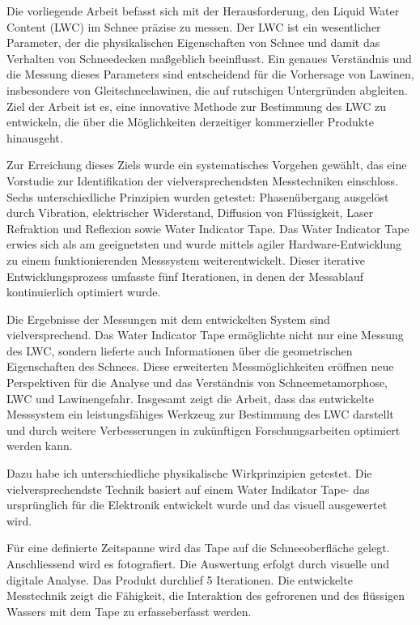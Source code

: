 Die vorliegende Arbeit befasst sich mit der Herausforderung, den Liquid Water Content (LWC) im Schnee präzise zu messen. Der LWC ist ein wesentlicher Parameter, der die physikalischen Eigenschaften von Schnee und damit das Verhalten von Schneedecken maßgeblich beeinflusst. Ein genaues Verständnis und die Messung dieses Parameters sind entscheidend für die Vorhersage von Lawinen, insbesondere von Gleitschneelawinen, die auf rutschigen Untergründen abgleiten. Ziel der Arbeit ist es, eine innovative Methode zur Bestimmung des LWC zu entwickeln, die über die Möglichkeiten derzeitiger kommerzieller Produkte hinausgeht.

Zur Erreichung dieses Ziels wurde ein systematisches Vorgehen gewählt, das eine Vorstudie zur Identifikation der vielversprechendsten Messtechniken einschloss. Sechs unterschiedliche Prinzipien wurden getestet: Phasenübergang ausgelöst durch Vibration, elektrischer Widerstand, Diffusion von Flüssigkeit, Laser Refraktion und Reflexion sowie Water Indicator Tape. Das Water Indicator Tape erwies sich als am geeignetsten und wurde mittels agiler Hardware-Entwicklung zu einem funktionierenden Messsystem weiterentwickelt. Dieser iterative Entwicklungsprozess umfasste fünf Iterationen, in denen der Messablauf kontinuierlich optimiert wurde.

Die Ergebnisse der Messungen mit dem entwickelten System sind vielversprechend. Das Water Indicator Tape ermöglichte nicht nur eine Messung des LWC, sondern lieferte auch Informationen über die geometrischen Eigenschaften des Schnees. Diese erweiterten Messmöglichkeiten eröffnen neue Perspektiven für die Analyse und das Verständnis von Schneemetamorphose, LWC und Lawinengefahr. Insgesamt zeigt die Arbeit, dass das entwickelte Messsystem ein leistungsfähiges Werkzeug zur Bestimmung des LWC darstellt und durch weitere Verbesserungen in zukünftigen Forschungsarbeiten optimiert werden kann.

\iffalse

Dazu habe ich unterschiedliche  physikalische Wirkprinzipien getestet. 
Die vielversprechendste Technik basiert auf einem Water Indikator Tape- das ursprünglich für die Elektronik entwickelt wurde und  das visuell ausgewertet wird.

 Für eine definierte Zeitspanne wird das Tape auf die Schneeoberfläche gelegt. Anschliessend wird es fotografiert. Die Auswertung erfolgt durch visuelle und digitale Analyse.
Das Produkt durchlief 5 Iterationen. Die entwickelte Messtechnik zeigt die Fähigkeit, die Interaktion des gefrorenen und des flüssigen Wassers mit dem Tape zu erfasseberfasst werden.

